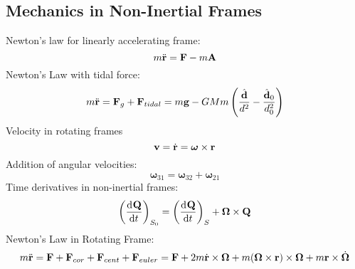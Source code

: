 \documentclass[../PHYS306Notes.tex]{subfiles}
\begin{document}
\subsection{Mechanics in Non-Inertial Frames}
Newton's law for linearly accelerating frame:
\begin{equation}
    m\ddot{\mathbf{r}} = \mathbf{F} - m\mathbf{A}
\end{equation}
Newton's Law with tidal force:
\begin{equation}
    m\ddot{\mathbf{r}} = \mathbf{F}_g + \mathbf{F}_{tidal} = m\mathbf{g} - GMm\left(\frac{\hat{\mathbf{d}}}{d^2} - \frac{\hat{\mathbf{d}}_0}{d_0^2}\right)
\end{equation}
Velocity in rotating frames
\begin{equation}
    \mathbf{v} = \dot{\mathbf{r}} = \bm{\omega} \times \mathbf{r}
\end{equation}
Addition of angular velocities:
\begin{equation}
    \bm{\omega}_{31} = \bm{\omega}_{32} + \bm{\omega}_{21}
\end{equation}
Time derivatives in non-inertial frames:
\begin{equation}
\left(\dod{\v{Q}}{t}\right)_{S_0} = \left(\dod{\v{Q}}{t}\right)_{S} + \bm{\Omega} \times \v{Q}
\end{equation}
Newton's Law in Rotating Frame:
\begin{equation}
    m\ddot{\mathbf{r}} = \mathbf{F} + \mathbf{F}_{cor} + \mathbf{F}_{cent} + \mathbf{F}_{euler} = \mathbf{F} + 2m\dot{\mathbf{r}}\times \bm{\Omega} + m(\bm{\Omega} \times \mathbf{r})\times \bm{\Omega} + m\mathbf{r} \times \dot{\bm{\Omega}}
\end{equation}
\end{document}

